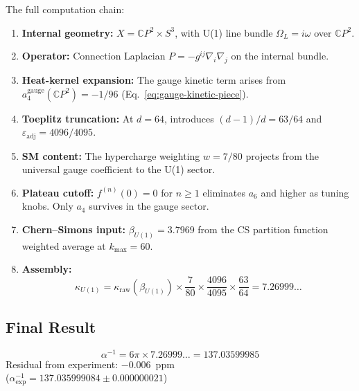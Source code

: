 \documentclass[12pt,a4paper]{article}
\begin{document}
The full computation chain:

\begin{enumerate}
\item \textbf{Internal geometry:}
$X = \mathbb{C}P^2 \times S^3$, with U(1) line bundle
$\Omega_L = i\omega$ over $\mathbb{C}P^2$.

\item \textbf{Operator:} Connection Laplacian $P = -g^{ij}\nabla_i\nabla_j$
on the internal bundle.

\item \textbf{Heat-kernel expansion:} The gauge kinetic term arises from
$a_4^{\mathrm{gauge}}(\mathbb{C}P^2) = -1/96$
(Eq.~\ref{eq:gauge-kinetic-piece}).

\item \textbf{Toeplitz truncation:} At $d = 64$, introduces
$(d-1)/d = 63/64$ and $\varepsilon_{\mathrm{adj}} = 4096/4095$.

\item \textbf{SM content:} The hypercharge weighting $w = 7/80$
projects from the universal gauge coefficient to the U(1) sector.

\item \textbf{Plateau cutoff:} $f^{(n)}(0) = 0$ for $n \geq 1$
eliminates $a_6$ and higher as tuning knobs.  Only $a_4$ survives
in the gauge sector.

\item \textbf{Chern--Simons input:} $\beta_{U(1)} = 3.7969$ from
the CS partition function weighted average at $k_{\max} = 60$.

\item \textbf{Assembly:}
\begin{equation}\label{eq:kappa-assembled}
\kappa_{U(1)} = \kappa_{\mathrm{raw}}(\beta_{U(1)})
\times \frac{7}{80} \times \frac{4096}{4095} \times \frac{63}{64}
= 7.26999\ldots
\end{equation}
\end{enumerate}

\subsection{Final Result}

\begin{tcolorbox}[colback=blue!5!white, colframe=blue!50!black,
  title=The DFD Prediction for $\alpha^{-1}$]
\begin{equation}
\boxed{
\alpha^{-1} = 6\pi \times 7.26999\ldots = 137.03599985
}
\end{equation}
Residual from experiment: $-0.006$~ppm\\
($\alpha^{-1}_{\mathrm{exp}} = 137.035999084 \pm 0.000000021$)
\end{tcolorbox}
\end{document}
